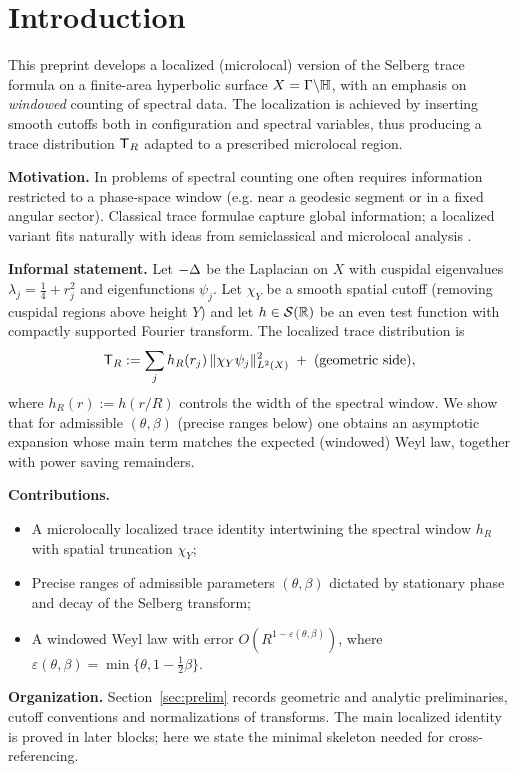 \section{Introduction}\label{sec:intro}

This preprint develops a localized (microlocal) version of the Selberg trace
formula on a finite-area hyperbolic surface
$X=\Gamma\backslash\mathbb{H}$, with an emphasis on \emph{windowed} counting of
spectral data. The localization is achieved by inserting smooth
cutoffs both in configuration and spectral variables, thus producing a
trace distribution $\mathsf{T}_R$ adapted to a prescribed microlocal region.

\smallskip
\noindent\textbf{Motivation.}
In problems of spectral counting one often requires information restricted
to a phase-space window (e.g. near a geodesic segment or in a fixed
angular sector). Classical trace formulae \cite{selberg1956,hejhal1976}
capture global information; a localized variant fits naturally with ideas
from semiclassical and microlocal analysis
\cite{zworski2012,dyatlovzworski2019}.

\smallskip
\noindent\textbf{Informal statement.}
Let $-\Delta$ be the Laplacian on $X$ with cuspidal eigenvalues
$\lambda_j=\tfrac14+r_j^2$ and eigenfunctions $\psi_j$.
Let $\chi_Y$ be a smooth spatial cutoff (removing cuspidal regions above
height $Y$) and let $h\in\mathcal{S}(\mathbb{R})$ be an even test function with
compactly supported Fourier transform. The localized trace distribution is
\[
  \mathsf{T}_R := \sum_j h_R(r_j)\,\|\chi_Y\psi_j\|_{L^2(X)}^2 \;+\; \text{(geometric side)},
\]
where $h_R(r):=h(r/R)$ controls the width of the spectral window. We show
that for admissible $(\theta,\beta)$ (precise ranges below) one obtains an
asymptotic expansion whose main term matches the expected (windowed) Weyl
law, together with power saving remainders.

\smallskip
\noindent\textbf{Contributions.}
\begin{itemize}
  \item A microlocally localized trace identity intertwining the spectral
        window $h_R$ with spatial truncation $\chi_Y$;
  \item Precise ranges of admissible parameters $(\theta,\beta)$ dictated
        by stationary phase and decay of the Selberg transform;
  \item A windowed Weyl law with error $O(R^{1-\varepsilon(\theta,\beta)})$,
        where $\varepsilon(\theta,\beta)=\min\{\theta,1-\tfrac12\beta\}$.
\end{itemize}

\smallskip
\noindent\textbf{Organization.}
Section~\ref{sec:prelim} records geometric and analytic preliminaries,
cutoff conventions and normalizations of transforms.
The main localized identity is proved in later blocks; here we state the
minimal skeleton needed for cross-referencing.
